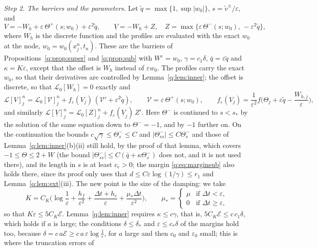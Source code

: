 \documentclass[11pt]{amsart}
\theoremstyle{definition}
\theoremstyle{remark}
\newcommand{\ve}{\varepsilon}
\newcommand{\Lop}{\mathcal{L}}
\begin{document}
\emph{Step 2. The barriers and the parameters.} Let $\tilde q=\max\{1,\sup|w_0|\}$,
$s=\tilde v^\pm/\ve$, and
\[
V=-W_h+\ve\,\Theta^+(s;w_0)+\ve^2\tilde q,\qquad
\underline V=-W_h+Z,\quad Z=\max\big\{\ve\,\Theta^-(s;w_0),\,-\ve^2\tilde q\big\},
\]
where $W_h$ is the discrete function and the profiles are evaluated with the exact
$w_0$ at the node, $w_0=w_0(x^n_j,t_n)$. These are the barriers of
Propositions~\ref{q:prop:super} and \ref{q:prop:sub} with $W^\ve=w_0$, $\gamma=c_1\delta$,
$\bar q=\ve\tilde q$ and $\kappa=K\ve$, except that the offset is $W_h$ instead of $\ve w_0$. The
profiles carry the exact $w_0$, so that their derivatives are controlled by
Lemma~\ref{q:lem:inner}; the offset is discrete, so that $\Lop_0[W_h]=0$ exactly and
\begin{equation}\label{cv:eq:split}
\Lop[V]^n_j=\Lop_0[\mathcal V]^n_j+f_\ve(V_j)\,(\mathcal V'+\ve^2\tilde q),\qquad
\mathcal V=\ve\,\Theta^+(s;w_0),\qquad
f_\ve(V_j)=\frac1{\ve^2}f\Big(\Theta_j+\ve\tilde q-\frac{W_{h,j}}\ve\Big),
\end{equation}
and similarly $\Lop[\underline V]^n_j=\Lop_0[Z]^n_j+f_\ve(\underline V_j)\,Z'$. Here $\Theta^-$ is continued to
$s<s_*$ by the solution of
the same equation down to $\Theta^-=-1$, and by $-1$ further on. On the continuation the
bounds $c\sqrt\gamma\le\Theta^-_s\le C$ and $|\Theta^-_{ss}|\le C\Theta^-_s$ and those of
Lemma~\ref{q:lem:inner}(b)(ii) still hold, by the proof of that lemma, which covers
$-1\le\Theta\le2+W$ (the bound $|\Theta^-_{ss}|\le C(\bar q+\kappa\Theta^-_s)$ does not, and it
is not used there), and its length in $s$ is at least $c_e>0$; the margin
\eqref{q:eq:marginsub} also holds there, since its proof only uses that
$d\le C\ve\log(1/\gamma)\le r_1$ and Lemma~\ref{q:lem:ext}(iii). The new
point is the size of the damping: we take
\begin{equation}\label{cv:eq:K}
K=C_K\Big(\log\frac1\ve+\frac{h_f}{\ve^2}+\frac{\Delta t+h_c}\ve+\frac{\mu_*\Delta t}{\ve^2}\Big),\qquad
\mu_*=\begin{cases}\mu&\text{if }\Delta t<\ve,\\ 0&\text{if }\Delta t\ge\ve,\end{cases}
\end{equation}
so that $K\ve\le5C_K\mathcal E$.
Lemma~\ref{q:lem:inner} requires $\kappa\le c\gamma$, that is,
$5C_K\mathcal E\le c\,c_1\delta$, which holds if $a$ is large; the conditions $\delta\le\delta_*$ and
$\ve\le c_*\delta$ of the margins hold too, because $\delta=c\,a\mathcal E\ge c\,a\,\ve\log\frac1\ve$, for
$a$ large and then $c_0$ and $\ve_0$ small; this is where the truncation errors of
\end{document}
